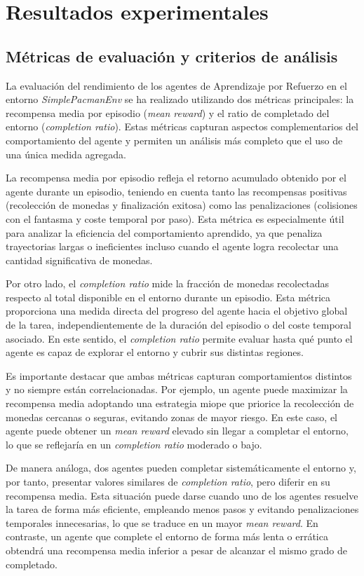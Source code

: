 \chapter{Resultados experimentales}

\section{Métricas de evaluación y criterios de análisis}

La evaluación del rendimiento de los agentes de Aprendizaje por Refuerzo en el entorno \textit{SimplePacmanEnv} se ha realizado utilizando dos métricas principales: la recompensa media por episodio (\textit{mean reward}) y el ratio de completado del entorno (\textit{completion ratio}). Estas métricas capturan aspectos complementarios del comportamiento del agente y permiten un análisis más completo que el uso de una única medida agregada.

La recompensa media por episodio refleja el retorno acumulado obtenido por el agente durante un episodio, teniendo en cuenta tanto las recompensas positivas (recolección de monedas y finalización exitosa) como las penalizaciones (colisiones con el fantasma y coste temporal por paso). Esta métrica es especialmente útil para analizar la eficiencia del comportamiento aprendido, ya que penaliza trayectorias largas o ineficientes incluso cuando el agente logra recolectar una cantidad significativa de monedas.

Por otro lado, el \textit{completion ratio} mide la fracción de monedas recolectadas respecto al total disponible en el entorno durante un episodio. Esta métrica proporciona una medida directa del progreso del agente hacia el objetivo global de la tarea, independientemente de la duración del episodio o del coste temporal asociado. En este sentido, el \textit{completion ratio} permite evaluar hasta qué punto el agente es capaz de explorar el entorno y cubrir sus distintas regiones.

Es importante destacar que ambas métricas capturan comportamientos distintos y no siempre están correlacionadas. Por ejemplo, un agente puede maximizar la recompensa media adoptando una estrategia miope que priorice la recolección de monedas cercanas o seguras, evitando zonas de mayor riesgo. En este caso, el agente puede obtener un \textit{mean reward} elevado sin llegar a completar el entorno, lo que se reflejaría en un \textit{completion ratio} moderado o bajo.

De manera análoga, dos agentes pueden completar sistemáticamente el entorno y, por tanto, presentar valores similares de \textit{completion ratio}, pero diferir en su recompensa media. Esta situación puede darse cuando uno de los agentes resuelve la tarea de forma más eficiente, empleando menos pasos y evitando penalizaciones temporales innecesarias, lo que se traduce en un mayor \textit{mean reward}. En contraste, un agente que complete el entorno de forma más lenta o errática obtendrá una recompensa media inferior a pesar de alcanzar el mismo grado de completado.

